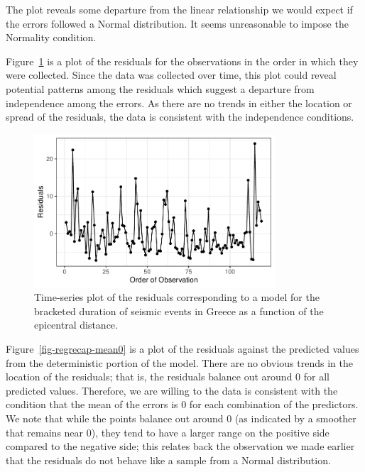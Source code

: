 \documentclass[
  letterpaper,
  DIV=11,
  numbers=noendperiod]{scrreprt}
\theoremstyle{plain}
\theoremstyle{definition}
\theoremstyle{definition}
\theoremstyle{remark}
\begin{document}
The plot reveals some departure from the linear relationship we would
expect if the errors followed a Normal distribution. It seems
unreasonable to impose the Normality condition.

Figure~\ref{fig-regrecap-indep} is a plot of the residuals for the
observations in the order in which they were collected. Since the data
was collected over time, this plot could reveal potential patterns among
the residuals which suggest a departure from independence among the
errors. As there are no trends in either the location or spread of the
residuals, the data is consistent with the independence conditions.

\begin{figure}

{\centering \includegraphics[width=0.8\textwidth,height=\textheight]{./images/fig-regrecap-indep-1.pdf}

}

\caption{\label{fig-regrecap-indep}Time-series plot of the residuals
corresponding to a model for the bracketed duration of seismic events in
Greece as a function of the epicentral distance.}

\end{figure}

Figure~\ref{fig-regrecap-mean0} is a plot of the residuals against the
predicted values from the deterministic portion of the model. There are
no obvious trends in the location of the residuals; that is, the
residuals balance out around 0 for all predicted values. Therefore, we
are willing to the data is consistent with the condition that the mean
of the errors is 0 for each combination of the predictors. We note that
while the points balance out around 0 (as indicated by a smoother that
remains near 0), they tend to have a larger range on the positive side
compared to the negative side; this relates back the observation we made
earlier that the residuals do not behave like a sample from a Normal
distribution.
\end{document}
